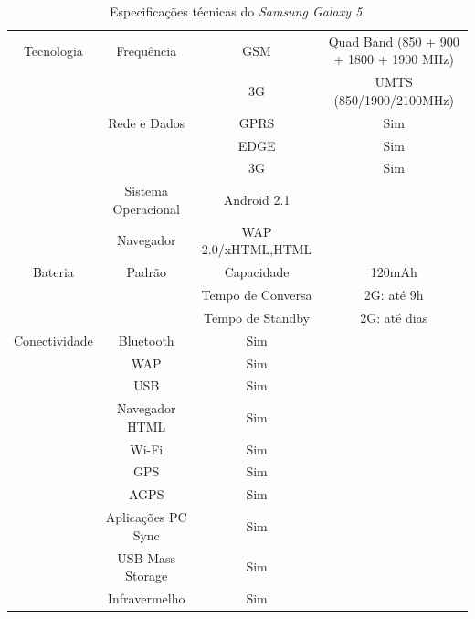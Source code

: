 \documentclass[12pt,a4paper,oneside]{report}
\begin{document}
\begin{table}[h!]
    \tiny
    \begin{tabular}{|c|c|c|c|}
	\hline
	Tecnologia & Frequência & GSM & Quad Band (850 + 900 + 1800 + 1900 MHz)\\ \cline{3-4}
	& & 3G & UMTS (850/1900/2100MHz) \\ \cline{2-4}
	& Rede \; e \; Dados & GPRS & Sim \\ \cline{3-4}
	& & EDGE & Sim \\ \cline{3-4}
	& & 3G & Sim \\ \cline{2-4}
	& Sistema Operacional & Android 2.1 & \\ \cline{2-3}
	& Navegador & WAP 2.0/xHTML,HTML & \\ \hline
	Bateria & Padrão & Capacidade & 120mAh \\ \cline{3-4}
	& & Tempo de Conversa & 2G: \; até \; 9h \\ \cline{3-4}
	& & Tempo de Standby & 2G: \; até \; 20 \; dias \\ \hline
	Conectividade & Bluetooth & Sim & \\ \cline{2-3}
	& WAP & Sim & \\ \cline{2-3}
	& USB & Sim & \\ \cline{2-3}
	& Navegador \; HTML & Sim & \\ \cline{2-3}
	& Wi-Fi & Sim & \\ \cline{2-3}
	& GPS & Sim & \\ \cline{2-3}
	& AGPS & Sim & \\ \cline{2-3}
	& Aplicações \; PC \; Sync & Sim & \\ \cline{2-3}
	& USB \; Mass \; Storage & Sim & \\ \cline{2-3}
	& Infravermelho & Sim & \\ \hline
    \end{tabular}
    \tiny
    \caption{Especificações técnicas do \emph{Samsung Galaxy 5}.}
    \label{tab:galax5}
\end{table}
\end{document}
